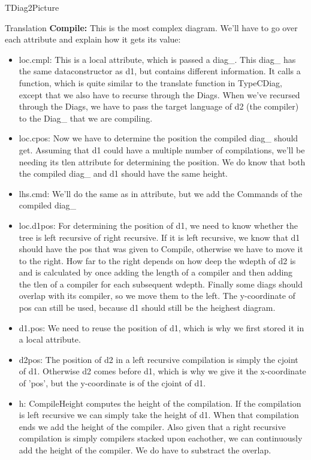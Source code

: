 \documentclass{article}
\begin{document}
\begin{subsection}{TDiag2Picture}
\begin{subsubsection}{Translation}
\textbf{Compile:} This is the most complex diagram. We'll have to go over each attribute and explain how it gets its value:
	\begin{itemize}
	\item loc.cmpl: This is a local attribute, which is passed a diag\_. This diag\_ has the same dataconstructor as d1, but contains different information. It calls a function, which is quite similar to the translate function in TypeCDiag, except that we also have to recurse through the Diags. When we've recursed through the Diags, we have to pass the target language of d2 (the compiler) to the Diag\_ that we are compiling. 
	\item loc.cpos: Now we have to determine the position the compiled diag\_ should get. Assuming that d1 could have a multiple number of compilations, we'll be needing its tlen attribute for determining the position. We do know that both the compiled diag\_ and d1 should have the same height.
	\item lhs.cmd: We'll do the same as in attribute, but we add the Commands of the compiled diag\_
	\item loc.d1pos: For determining the position of d1, we need to know whether the tree is left recursive of right recursive. If it is left recursive, we know that d1 should have the pos that was given to Compile, otherwise we have to move it to the right. How far to the right depends on how deep the wdepth of d2 is and is calculated by once adding the length of a compiler and then adding the tlen of a compiler for each subsequent wdepth. Finally some diags should overlap with its compiler, so we move them to the left. The y-coordinate of pos can still be used, because d1 should still be the heighest diagram. 
	\item d1.pos: We need to reuse the position of d1, which is why we first stored it in a local attribute.
	\item d2pos: The position of d2 in a left recursive compilation is simply the cjoint of d1. Otherwise d2 comes before d1, which is why we give it the x-coordinate of 'pos', but the y-coordinate is of the cjoint of d1.
	\item h: CompileHeight computes the height of the compilation. If the compilation is left recursive we can simply take the height of d1. When that compilation ends we add the height of the compiler. Also given that a right recursive compilation is simply compilers stacked upon eachother, we can continuously add the height of the compiler. We do have to substract the overlap.

\end{itemize}
\end{subsubsection}
\end{subsection}
\end{document}
